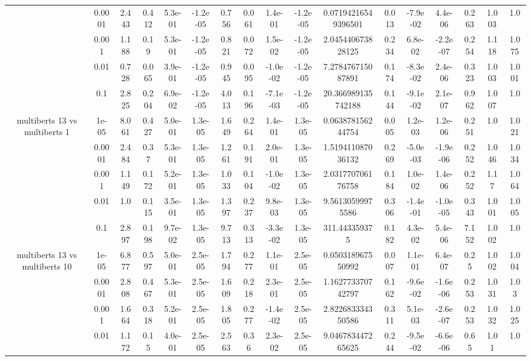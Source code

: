 \begin{tabular}{|c|c|c|c|c|c|c|c|c|c|c|c|c|c|c|c|c|}
 & 0.0001 & 2.443 & 0.412 & 5.3e-01 & -1.2e-05 & 0.756 & 0.061 & 1.4e-01 & -1.2e-05 & 0.07194216549396501 & 0.013 & -7.9e-02 & 4.4e-06 & 0.263 & 1.003 & 1.0 \\
 & 0.001 & 1.188 & 0.19 & 5.3e-01 & -1.2e-05 & 0.821 & 0.072 & 1.5e-02 & -1.2e-05 & 2.045440673828125 & 0.234 & 6.8e-02 & -2.2e-07 & 0.254 & 1.118 & 1.075 \\
 & 0.01 & 0.728 & 0.065 & 3.9e-01 & -1.2e-05 & 0.945 & 0.095 & -1.0e-02 & -1.2e-05 & 7.278476715087891 & 0.174 & -8.3e-02 & 2.4e-06 & 0.323 & 1.003 & 1.001 \\
 & 0.1 & 2.825 & 0.204 & 6.9e-02 & -1.2e-05 & 4.013 & 0.196 & -7.1e-03 & -1.2e-05 & 20.366989135742188 & 0.144 & -9.1e-02 & 2.1e-07 & 0.962 & 1.007 & 1.0 \\
\hline
\multirow{5}{*}{multiberts 13 vs multiberts 1} & 1e-05 & 8.061 & 0.427 & 5.0e-01 & 1.3e-05 & 1.649 & 0.264 & 1.4e-01 & 1.3e-05 & 0.063878156244754 & 0.005 & 1.2e-03 & 1.2e-06 & 0.251 & 1.0 & 1.021 \\
 & 0.0001 & 2.484 & 0.37 & 5.3e-01 & 1.3e-05 & 1.261 & 0.191 & 2.0e-01 & 1.3e-05 & 1.519411087036132 & 0.269 & -5.0e-03 & -1.9e-06 & 0.252 & 1.046 & 1.034 \\
 & 0.001 & 1.149 & 0.172 & 5.2e-01 & 1.3e-05 & 1.033 & 0.104 & -1.0e-02 & 1.3e-05 & 2.031770706176758 & 0.184 & 1.0e-02 & 1.4e-06 & 0.252 & 1.17 & 1.064 \\
 & 0.01 & 1.0 & 0.115 & 3.5e-01 & 1.3e-05 & 1.397 & 0.237 & 9.8e-03 & 1.3e-05 & 9.56130599975586 & 0.306 & -1.4e-01 & -1.0e-05 & 0.343 & 1.001 & 1.005 \\
 & 0.1 & 2.897 & 0.198 & 9.7e-02 & 1.3e-05 & 9.713 & 0.313 & -3.3e-02 & 1.3e-05 & 311.443359375 & 0.182 & 4.3e-02 & 5.4e-06 & 7.152 & 1.002 & 1.0 \\
\hline
\multirow{5}{*}{multiberts 13 vs multiberts 10} & 1e-05 & 6.877 & 0.597 & 5.0e-01 & 2.5e-05 & 1.794 & 0.277 & 1.1e-01 & 2.5e-05 & 0.050318967550992 & 0.007 & 1.1e-01 & 6.4e-07 & 0.25 & 1.002 & 1.004 \\
 & 0.0001 & 2.808 & 0.467 & 5.3e-01 & 2.5e-05 & 1.609 & 0.218 & 2.3e-01 & 2.5e-05 & 1.162773370742797 & 0.162 & -9.6e-02 & -1.6e-06 & 0.253 & 1.031 & 1.03 \\
 & 0.001 & 1.664 & 0.318 & 5.2e-01 & 2.5e-05 & 1.805 & 0.277 & -1.4e-02 & 2.5e-05 & 2.822683334350586 & 0.311 & 5.1e-03 & -2.6e-07 & 0.253 & 1.032 & 1.025 \\
 & 0.01 & 1.172 & 0.15 & 4.0e-01 & 2.5e-05 & 2.563 & 0.36 & 2.3e-02 & 2.5e-05 & 9.046783447265625 & 0.244 & -9.5e-02 & -6.6e-06 & 0.65 & 1.01 & 1.0 \\

\end{tabular}
